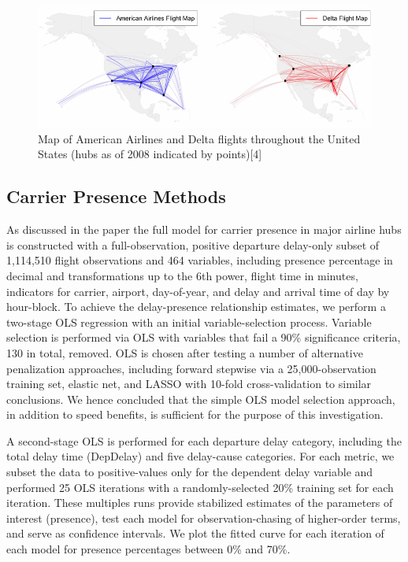 \documentclass{article} %
\begin{document}
\break
\begin{figure}[h]

\includegraphics[width=\textwidth,height=\textheight,keepaspectratio]{flight_map}
\caption{Map of American Airlines and Delta flights throughout the United States (hubs as of 2008 indicated by points)[4]}

\end{figure}


\subsection{Carrier Presence Methods}
\label{appendix_hub}

As discussed in the paper the full model for carrier presence in major airline hubs is constructed with a full-observation, positive departure delay-only subset of 1,114,510 flight observations and 464 variables, including presence percentage in decimal and transformations up to the 6th power, flight time in minutes, indicators for carrier, airport, day-of-year, and delay and arrival time of day by hour-block. To achieve the delay-presence relationship estimates, we perform a two-stage OLS regression with an initial variable-selection process. Variable selection is performed via OLS with variables that fail a 90\% significance criteria, 130 in total, removed. OLS is chosen after testing a number of alternative penalization approaches, including forward stepwise via a 25,000-observation training set, elastic net, and LASSO with 10-fold cross-validation to similar conclusions. We hence concluded that the simple OLS model selection approach, in addition to speed benefits, is sufficient for the purpose of this investigation. 

A second-stage OLS is performed for each departure delay category, including the total delay time (DepDelay) and five delay-cause categories. For each metric, we subset the data to positive-values only for the dependent delay variable and performed 25 OLS iterations with a randomly-selected 20\% training set for each iteration. These multiples runs provide stabilized estimates of the parameters of interest (presence), test each model for observation-chasing of higher-order terms, and serve as confidence intervals. We plot the fitted curve for each iteration of each model for presence percentages between 0\% and 70\%. 
\end{document}
